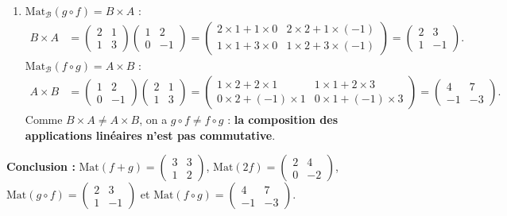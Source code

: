 \documentclass[11pt]{article}
\begin{document}
\begin{exoresolu}
\begin{enumerate}
$\mathrm{Mat}_{\mathcal{B}}(2f)=2A=\begin{pmatrix} 2 & 4 \\ 0 & -2 \end{pmatrix}$.
\item $\mathrm{Mat}_{\mathcal{B}}(g\circ f)=B\times A$ :
\begin{align*}
B\times A&=\begin{pmatrix} 2 & 1 \\ 1 & 3 \end{pmatrix}\begin{pmatrix} 1 & 2 \\ 0 & -1 \end{pmatrix}=\begin{pmatrix} 2\times 1+1\times 0 & 2\times 2+1\times(-1) \\ 1\times 1+3\times 0 & 1\times 2+3\times(-1) \end{pmatrix}=\begin{pmatrix} 2 & 3 \\ 1 & -1 \end{pmatrix}.
\end{align*}
$\mathrm{Mat}_{\mathcal{B}}(f\circ g)=A\times B$ :
\begin{align*}
A\times B&=\begin{pmatrix} 1 & 2 \\ 0 & -1 \end{pmatrix}\begin{pmatrix} 2 & 1 \\ 1 & 3 \end{pmatrix}=\begin{pmatrix} 1\times 2+2\times 1 & 1\times 1+2\times 3 \\ 0\times 2+(-1)\times 1 & 0\times 1+(-1)\times 3 \end{pmatrix}=\begin{pmatrix} 4 & 7 \\ -1 & -3 \end{pmatrix}.
\end{align*}
Comme $B\times A\neq A\times B$, on a $g\circ f\neq f\circ g$ : \textbf{la composition des applications linéaires n'est pas commutative}.
\end{enumerate}
\textbf{Conclusion :} $\mathrm{Mat}(f+g)=\begin{pmatrix} 3 & 3 \\ 1 & 2 \end{pmatrix}$, $\mathrm{Mat}(2f)=\begin{pmatrix} 2 & 4 \\ 0 & -2 \end{pmatrix}$, $\mathrm{Mat}(g\circ f)=\begin{pmatrix} 2 & 3 \\ 1 & -1 \end{pmatrix}$ et $\mathrm{Mat}(f\circ g)=\begin{pmatrix} 4 & 7 \\ -1 & -3 \end{pmatrix}$.
\end{exoresolu}
\end{document}
